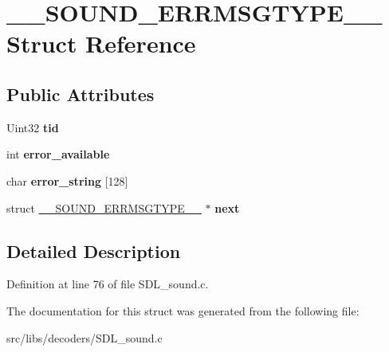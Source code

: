 \hypertarget{struct____SOUND__ERRMSGTYPE____}{\section{\-\_\-\-\_\-\-S\-O\-U\-N\-D\-\_\-\-E\-R\-R\-M\-S\-G\-T\-Y\-P\-E\-\_\-\-\_\- Struct Reference}
\label{struct____SOUND__ERRMSGTYPE____}
}
\subsection*{Public Attributes}
\begin{DoxyCompactItemize}
\item 
\hypertarget{struct____SOUND__ERRMSGTYPE_____a3c773b133a83b6b2729b21400353632f}{Uint32 {\bfseries tid}}\label{struct____SOUND__ERRMSGTYPE_____a3c773b133a83b6b2729b21400353632f}

\item 
\hypertarget{struct____SOUND__ERRMSGTYPE_____a9a376ce063529b042358de42260cbe3c}{int {\bfseries error\-\_\-available}}\label{struct____SOUND__ERRMSGTYPE_____a9a376ce063529b042358de42260cbe3c}

\item 
\hypertarget{struct____SOUND__ERRMSGTYPE_____a7e2e32d60a24f5f0459a56038eba03ce}{char {\bfseries error\-\_\-string} \mbox{[}128\mbox{]}}\label{struct____SOUND__ERRMSGTYPE_____a7e2e32d60a24f5f0459a56038eba03ce}

\item 
\hypertarget{struct____SOUND__ERRMSGTYPE_____a9ca85eb5d5e2b74f72ad32a6c153e678}{struct \hyperlink{struct____SOUND__ERRMSGTYPE____}{\-\_\-\-\_\-\-S\-O\-U\-N\-D\-\_\-\-E\-R\-R\-M\-S\-G\-T\-Y\-P\-E\-\_\-\-\_\-} $\ast$ {\bfseries next}}\label{struct____SOUND__ERRMSGTYPE_____a9ca85eb5d5e2b74f72ad32a6c153e678}

\end{DoxyCompactItemize}


\subsection{Detailed Description}


Definition at line 76 of file S\-D\-L\-\_\-sound.\-c.



The documentation for this struct was generated from the following file\-:\begin{DoxyCompactItemize}
\item 
src/libs/decoders/S\-D\-L\-\_\-sound.\-c\end{DoxyCompactItemize}
